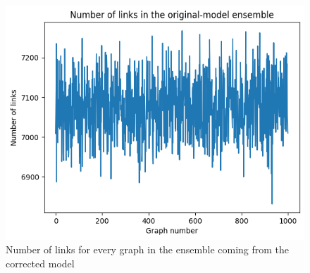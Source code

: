 \documentclass{article}
\begin{document}
\begin{figure}[!ht]
    \centering
    \includegraphics[scale=0.4]{img/metropolis/num_links_vanilla.png}
    \caption{Number of links for every graph in the ensemble coming from the corrected model}
\end{figure}
\end{document}
